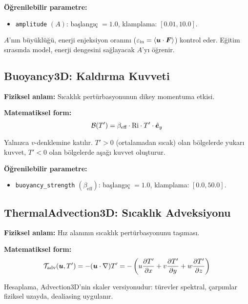 \textbf{Öğrenilebilir parametre:}
\begin{itemize}
    \item \texttt{amplitude} $(A)$: başlangıç $= 1.0$, klamplama: $[0.01, 10.0]$.
\end{itemize}
$A$'nın büyüklüğü, enerji enjeksiyon oranını ($\varepsilon_{\text{in}} = \langle \bm{u} \cdot \bm{F} \rangle$) kontrol eder. Eğitim sırasında model, enerji dengesini sağlayacak $A$'yı öğrenir.


\subsection{Buoyancy3D: Kaldırma Kuvveti}
\label{sec:buoyancy_noron}

\textbf{Fiziksel anlam:} Sıcaklık pertürbasyonunun dikey momentuma etkisi.

\textbf{Matematiksel form:}
\begin{equation}
    \mathcal{B}(T') = \beta_{\text{eff}} \cdot \mathrm{Ri} \cdot T' \cdot \hat{\bm{e}}_y
    \label{eq:buoyancy_neuron}
\end{equation}

Yalnızca $v$-denklemine katılır. $T' > 0$ (ortalamadan sıcak) olan bölgelerde yukarı kuvvet, $T' < 0$ olan bölgelerde aşağı kuvvet oluşturur.

\textbf{Öğrenilebilir parametre:}
\begin{itemize}
    \item \texttt{buoyancy\_strength} $(\beta_{\text{eff}})$: başlangıç $= 1.0$, klamplama: $[0.0, 50.0]$.
\end{itemize}


\subsection{ThermalAdvection3D: Sıcaklık Adveksiyonu}
\label{sec:thermal_adv_noron}

\textbf{Fiziksel anlam:} Hız alanının sıcaklık pertürbasyonunu taşıması.

\textbf{Matematiksel form:}
\begin{equation}
    \mathcal{T}_{\text{adv}}(\bm{u}, T') = -(\bm{u} \cdot \nabla)T' = -\left(u\frac{\partial T'}{\partial x} + v\frac{\partial T'}{\partial y} + w\frac{\partial T'}{\partial z}\right)
    \label{eq:thermal_adv_neuron}
\end{equation}

Hesaplama, Advection3D'nin skaler versiyonudur: türevler spektral, çarpımlar fiziksel uzayda, dealiasing uygulanır.


